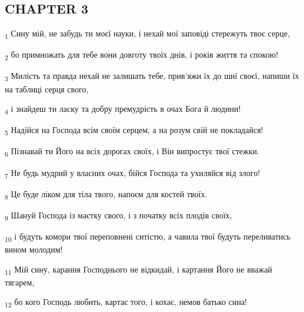\subsection{CHAPTER 3}
\begin{tcolorbox}
\textsubscript{1} Сину мій, не забудь ти моєї науки, і нехай мої заповіді стережуть твоє серце,
\end{tcolorbox}
\begin{tcolorbox}
\textsubscript{2} бо примножать для тебе вони довготу твоїх днів, і років життя та спокою!
\end{tcolorbox}
\begin{tcolorbox}
\textsubscript{3} Милість та правда нехай не залишать тебе, прив'яжи їх до шиї своєї, напиши їх на таблиці серця свого,
\end{tcolorbox}
\begin{tcolorbox}
\textsubscript{4} і знайдеш ти ласку та добру премудрість в очах Бога й людини!
\end{tcolorbox}
\begin{tcolorbox}
\textsubscript{5} Надійся на Господа всім своїм серцем, а на розум свій не покладайся!
\end{tcolorbox}
\begin{tcolorbox}
\textsubscript{6} Пізнавай ти Його на всіх дорогах своїх, і Він випростує твої стежки.
\end{tcolorbox}
\begin{tcolorbox}
\textsubscript{7} Не будь мудрий у власних очах, бійся Господа та ухиляйся від злого!
\end{tcolorbox}
\begin{tcolorbox}
\textsubscript{8} Це буде ліком для тіла твого, напоєм для костей твоїх.
\end{tcolorbox}
\begin{tcolorbox}
\textsubscript{9} Шануй Господа із маєтку свого, і з початку всіх плодів своїх,
\end{tcolorbox}
\begin{tcolorbox}
\textsubscript{10} і будуть комори твої переповнені ситістю, а чавила твої будуть переливатись вином молодим!
\end{tcolorbox}
\begin{tcolorbox}
\textsubscript{11} Мій сину, карання Господнього не відкидай, і картання Його не вважай тягарем,
\end{tcolorbox}
\begin{tcolorbox}
\textsubscript{12} бо кого Господь любить, картає того, і кохає, немов батько сина!
\end{tcolorbox}
